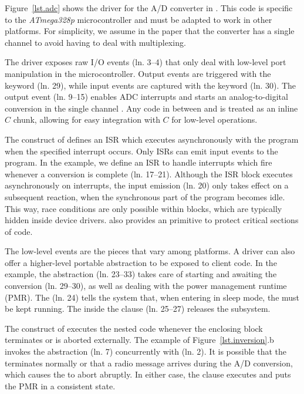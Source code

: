 Figure~\ref{lst.adc} shows the driver for the A/D converter in \CEU.
This code is specific to the \emph{ATmega328p} microcontroller and must be
adapted to work in other platforms.
For simplicity, we assume in the paper that the converter has a single channel
to avoid having to deal with multiplexing.

The driver exposes raw I/O events (ln. 3--4) that only deal with low-level
port manipulation in the microcontroller.
Output events are triggered with the  keyword (ln. 29), while input
events are captured with the  keyword (ln. 30).
%
The output event  (ln. 9--15) enables ADC interrupts and
starts an analog-to-digital conversion in the single channel .
Any code in between \code{\{} and \code{\}} is treated as an inline $C$ chunk,
allowing for easy integration with $C$ for low-level operations.

The  construct of \CEU defines an ISR which executes
asynchronously with the program when the specified interrupt occurs.
Only ISRs can emit input events to the program.
In the example, we define an ISR to handle  interrupts which fire
whenever a conversion is complete (ln. 17--21).
%
Although the ISR block executes asynchronously on interrupts, the input
emission (ln. 20) only takes effect on a subsequent reaction, when the
synchronous part of the program becomes idle.
%
This way, race conditions are only possible within  blocks,
which are typically hidden inside device drivers.
\CEU also provides an  primitive to protect critical sections of
code.

The low-level events are the pieces that vary among platforms.
A driver can also offer a higher-level portable abstraction to be exposed to
client code.
%
In the example, the  abstraction (ln. 23--33) takes care of
starting and awaiting the conversion (ln. 29--30), as well as dealing with the
power management runtime (PMR).
%
The  (ln. 24) tells the system that, when entering in
sleep mode, the  must be kept running.
%
The  inside the  clause (ln. 25--27)
releases the  subsystem.

The  construct of \CEU executes the nested code whenever the
enclosing block terminates or is aborted externally.
%
The example of Figure~\ref{lst.inversion}.b invokes the 
abstraction (ln. 7) concurrently with  (ln. 2).
%
It is possible that the  terminates normally or that a radio
message arrives during the A/D conversion, which causes the 
to abort abruptly.
In either case, the  clause executes and puts the PMR in a
consistent state.

